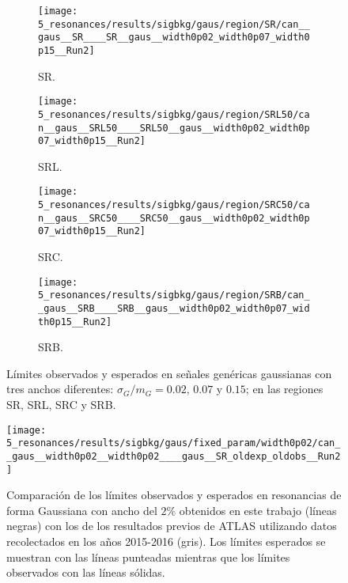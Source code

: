 \begin{figure}[ht!]
    \centering
    \begin{subfigure}[h]{0.49\linewidth}
        \centering
        \texttt{[image: 5\_resonances/results/sigbkg/gaus/region/SR/can\_\_gaus\_\_SR\_\_\_\_SR\_\_gaus\_\_width0p02\_width0p07\_width0p15\_\_Run2]}
        \caption{SR.}
    \end{subfigure}
    \begin{subfigure}[h]{0.49\linewidth}
        \centering
        \texttt{[image: 5\_resonances/results/sigbkg/gaus/region/SRL50/can\_\_gaus\_\_SRL50\_\_\_\_SRL50\_\_gaus\_\_width0p02\_width0p07\_width0p15\_\_Run2]}
        \caption{SRL.}
    \end{subfigure}
    \begin{subfigure}[h]{0.49\linewidth}
        \centering
        \texttt{[image: 5\_resonances/results/sigbkg/gaus/region/SRC50/can\_\_gaus\_\_SRC50\_\_\_\_SRC50\_\_gaus\_\_width0p02\_width0p07\_width0p15\_\_Run2]}
        \caption{SRC.}
    \end{subfigure}
    \begin{subfigure}[h]{0.49\linewidth}
        \centering
        \texttt{[image: 5\_resonances/results/sigbkg/gaus/region/SRB/can\_\_gaus\_\_SRB\_\_\_\_SRB\_\_gaus\_\_width0p02\_width0p07\_width0p15\_\_Run2]}
        \caption{SRB.}
    \end{subfigure}
    \caption{Límites observados y esperados en señales genéricas gaussianas con tres anchos diferentes: \(\sigma_G/m_G = 0.02, \, 0.07\) y \(0.15\); en las regiones SR, SRL, SRC y SRB.}
    \label{fig:results:results:bkgsig:results:gaus:limits}
\end{figure}

\begin{figure}[ht!]
    \centering
    \texttt{[image: 5\_resonances/results/sigbkg/gaus/fixed\_param/width0p02/can\_\_gaus\_\_width0p02\_\_width0p02\_\_\_\_gaus\_\_SR\_oldexp\_oldobs\_\_Run2]}
    \caption{Comparación de los límites observados y esperados en resonancias de forma Gaussiana con ancho del \(2\%\) obtenidos en este trabajo (líneas negras) con los de los resultados previos de \ac{ATLAS} utilizando datos recolectados en los años 2015-2016 (gris). Los límites esperados se muestran con las líneas punteadas mientras que los límites observados con las líneas sólidas.}
    \label{fig:results:results:bkgsig:results:gaus:limits_comparison_old}
\end{figure}


